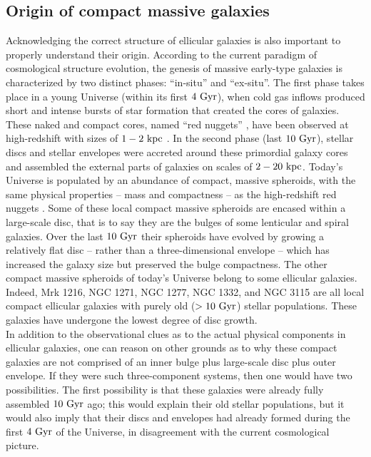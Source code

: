 \documentclass[useAMS,usenatbib,article]{mn2e}
\begin{document}
\subsection{Origin of compact massive galaxies}
Acknowledging the correct structure of ellicular galaxies is also important to properly understand their origin. 
According to the current paradigm of cosmological structure evolution, 
the genesis of massive early-type galaxies is characterized by two distinct phases: ``in-situ'' and ``ex-situ''. 
The first phase takes place in a young Universe (within its first $4~\rm Gyr$), 
when cold gas inflows produced short and intense bursts of star formation that created the cores of galaxies. 
These naked and compact cores, named ``red nuggets'' \citep{damjanov2009}, have been observed at high-redshift with sizes of $1-2~\rm kpc$ \citep{vandokkum2008}.
In the second phase (last $10~\rm Gyr$), stellar discs and stellar envelopes 
were accreted around these primordial galaxy cores and assembled the external parts of galaxies on scales of $2-20~\rm kpc$. 
Today's Universe is populated by an abundance of compact, massive spheroids, 
with the same physical properties -- mass and compactness -- as the high-redshift red nuggets \citep{GDS2015}. 
Some of these local compact massive spheroids are encased within a large-scale disc, 
that is to say they are the bulges of some lenticular and spiral galaxies. 
Over the last $10~\rm Gyr$ their spheroids have evolved by growing a relatively flat disc -- 
rather than a three-dimensional envelope -- 
which has increased the galaxy size but preserved the bulge compactness. 
The other compact massive spheroids of today's Universe belong to some ellicular galaxies. 
Indeed, Mrk 1216, NGC 1271, NGC 1277, NGC 1332, and NGC 3115 are all local compact ellicular galaxies 
with purely old ($>10~\rm Gyr$) stellar populations. 
These galaxies have undergone the lowest degree of disc growth. \\
In addition to the observational clues as to the actual physical components in ellicular galaxies, 
one can reason on other grounds as to why these compact galaxies are not comprised of an inner bulge 
plus large-scale disc plus outer envelope. 
If they were such three-component systems, then one would have two possibilities. 
The first possibility is that these galaxies were already fully assembled $10~\rm Gyr$ ago; 
this would explain their old stellar populations, 
but it would also imply that their discs and envelopes had already formed during the first $4~\rm Gyr$ of the Universe, 
in disagreement with the current cosmological picture. 
\end{document}
